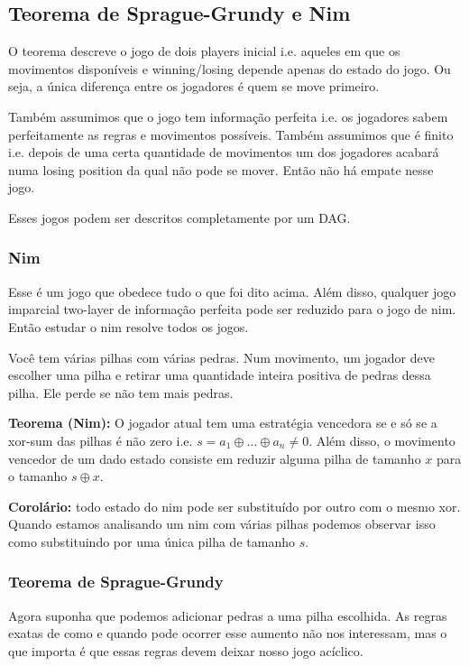 \subsection{Teorema de Sprague-Grundy e Nim}

O teorema descreve o jogo de dois players inicial i.e. aqueles em que os movimentos disponíveis e winning/losing depende apenas do estado do jogo. Ou seja, a única diferença entre os jogadores é quem se move primeiro.

Também assumimos que o jogo tem informação perfeita i.e. os jogadores sabem perfeitamente as regras e movimentos possíveis. Também assumimos que é finito i.e. depois de uma certa quantidade de movimentos um dos jogadores acabará numa losing position da qual não pode se mover. Então não há empate nesse jogo.

Esses jogos podem ser descritos completamente por um DAG.

\subsubsection{Nim}

Esse é um jogo que obedece tudo o que foi dito acima. Além disso, qualquer jogo imparcial two-layer de informação perfeita pode ser reduzido para o jogo de nim. Então estudar o nim resolve todos os jogos.

Você tem várias pilhas com várias pedras. Num movimento, um jogador deve escolher uma pilha e retirar uma quantidade inteira positiva de pedras dessa pilha. Ele perde se não tem mais pedras.

\textbf{Teorema (Nim):} O jogador atual tem uma estratégia vencedora se e só se a xor-sum das pilhas é não zero i.e. $s = a_1 \oplus \dots \oplus a_n \neq 0$. Além disso, o movimento vencedor de um dado estado consiste em reduzir alguma pilha de tamanho $x$ para o tamanho $s \oplus x$.

\textbf{Corolário:} todo estado do nim pode ser substituído por outro com o mesmo xor. Quando estamos analisando um nim com várias pilhas podemos observar isso como substituindo por uma única pilha de tamanho $s$.

\subsubsection{Teorema de Sprague-Grundy}

Agora suponha que podemos adicionar pedras a uma pilha escolhida. As regras exatas de como e quando pode ocorrer esse aumento não nos interessam, mas o que importa é que essas regras devem deixar nosso jogo acíclico.

